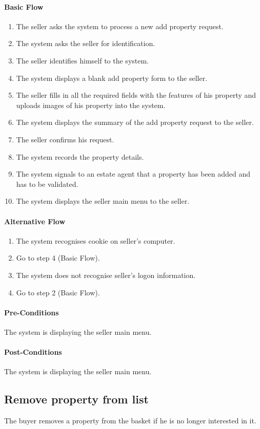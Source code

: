 \documentclass[a4paper,12pt]{article}
\begin{document}
\paragraph{Basic Flow}
\begin{enumerate}
\item The seller asks the system to process a new add property request.
\item The system asks the seller for identification.
\item The seller identifies himself to the system.
\item The system displays a blank add property form to the seller.
\item The seller fills in all the required fields with the features of his property and uploads images of his property into the system.
\item The system displays the summary of the add property request to the seller.
\item The seller confirms his request.
\item The system records the property details.
\item The system signals to an estate agent that a property has been added and has to be validated.
\item The system displays the seller main menu to the seller.
\end{enumerate}
\paragraph{Alternative Flow}
\begin{enumerate}
\item The system recognises cookie on seller's computer.
\item Go to step 4 (Basic Flow).
\item The system does not recognise seller's logon information.
\item Go to step 2 (Basic Flow).
\end{enumerate}
\paragraph{Pre-Conditions}
The system is displaying the seller main menu.
\paragraph{Post-Conditions}
The system is displaying the seller main menu.

\subsection{Remove property from list}
The buyer removes a property from the basket if he is no longer interested in it.
\end{document}

